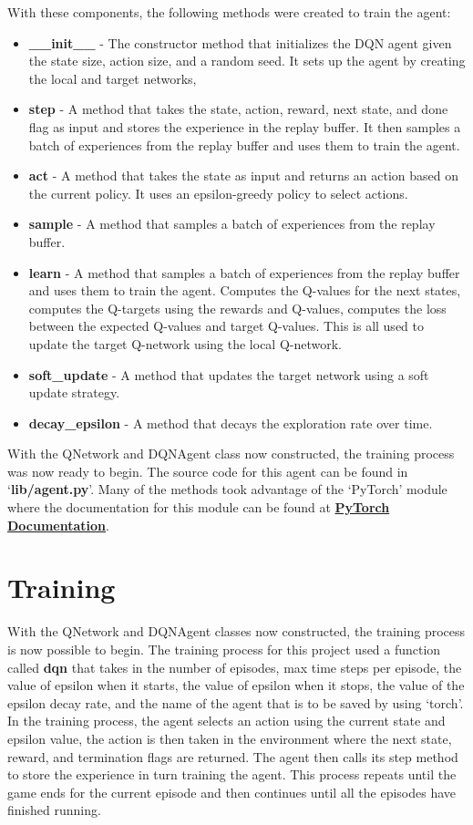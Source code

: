 \documentclass[
	a4paper, %
	10pt, %
	unnumberedsections, %
	twoside, %
]{LTJournalArticle}
\begin{document}
With these components, the following methods were created to train the agent:

\begin{itemize}
	\item \textbf{\_\_init\_\_} - The constructor method that initializes the DQN agent given the state size, action size, and a random seed. It sets up the agent by creating the local and target networks,
	\item \textbf{step} - A method that takes the state, action, reward, next state, and done flag as input and stores the experience in the replay buffer. It then samples a batch of experiences from 
	the replay buffer and uses them to train the agent.
	\item \textbf{act} - A method that takes the state as input and returns an action based on the current policy. It uses an epsilon-greedy policy to select actions.
	\item \textbf{sample} - A method that samples a batch of experiences from the replay buffer.
	\item \textbf{learn} - A method that samples a batch of experiences from the replay buffer and uses them to train the agent. Computes the Q-values for the next states, computes the Q-targets using the
	rewards and Q-values, computes the loss between the expected Q-values and target Q-values. This is all used to update the target Q-network using the local Q-network.
	\item \textbf{soft\_update} - A method that updates the target network using a soft update strategy.
	\item \textbf{decay\_epsilon} - A method that decays the exploration rate over time.
\end{itemize}

With the QNetwork and DQNAgent class now constructed, the training process was now ready to begin. The source code for this agent can be found in `\textbf{lib/agent.py}'. Many of the methods took advantage
of the `PyTorch' module where the documentation for this module can be found at \href{https://pytorch.org/docs/stable/index.html}{\textbf{PyTorch Documentation}}.

\section{Training}

With the QNetwork and DQNAgent classes now constructed, the training process is now possible to begin. The training process for this project used a function called \textbf{dqn} that takes in the number of 
episodes, max time steps per episode, the value of epsilon when it starts, the value of epsilon when it stops, the value of the epsilon decay rate, and the name of the agent that is to be saved by using
`torch'. In the training process, the agent selects an action using the current state and epsilon value, the action is then taken in the environment where the next state, reward, and termination flags 
are returned. The agent then calls its step method to store the experience in turn training the agent. This process repeats until the game ends for the current episode and then continues until all the episodes
have finished running.
\end{document}

